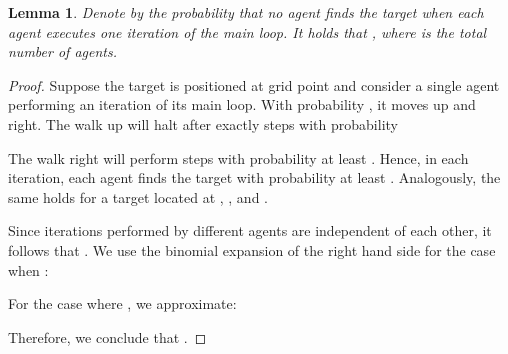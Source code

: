 \documentclass[11pt]{article}
\newtheorem{lemma}[theorem]{Lemma}
\begin{document}
\begin{lemma}
\label{lem:iterations}
	Denote by  the probability that no agent finds the target when each agent executes one iteration of the main loop. It holds that , where  is the total number of agents.
\end{lemma}

\begin{proof}
	Suppose the target is positioned at grid point  and consider a single agent performing an iteration of its main loop. With probability , it moves up and right. The walk up will halt after exactly  steps with probability

The walk right will perform  steps with probability at least . Hence, in each iteration, each agent finds the target with probability at least . Analogously, the same holds for a target located at , , and . 

Since iterations performed by different agents are independent of each other, it follows that . We use the binomial expansion of the right hand side for the case when :



For the case where , we approximate:



Therefore, we conclude that .

\end{proof}
\end{document}
